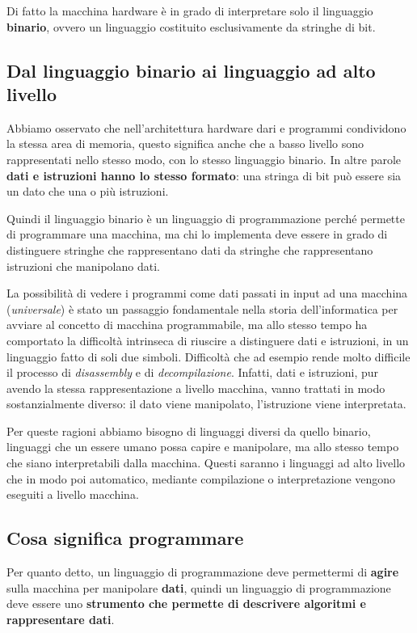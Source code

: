 \documentclass[oneside,a4paper,11pt]{book}
\theoremstyle{italicstyle}
\theoremstyle{normStyle}
\begin{document}
Di fatto la macchina hardware è in grado di interpretare solo il 
linguaggio \textbf{binario}, ovvero un linguaggio costituito esclusivamente 
da stringhe di bit.
\subsection{Dal linguaggio binario ai linguaggio ad alto livello}
Abbiamo osservato che nell'architettura hardware dari e programmi 
condividono la stessa area di memoria, questo significa anche che a basso 
livello sono rappresentati nello stesso modo, con lo stesso linguaggio 
binario. In altre parole \textbf{dati e istruzioni hanno lo stesso formato}: 
una stringa di bit può essere sia un dato che una o più istruzioni.

Quindi il linguaggio binario è un linguaggio di programmazione perché 
permette di programmare una macchina, ma chi lo implementa deve essere 
in grado di distinguere stringhe che rappresentano dati da stringhe 
che rappresentano istruzioni che manipolano dati.

La possibilità di vedere i programmi come dati passati in input ad 
una macchina (\textit{universale}) è stato un passaggio fondamentale 
nella storia dell'informatica per avviare al concetto di macchina 
programmabile, ma allo stesso tempo ha comportato la difficoltà intrinseca 
di riuscire a distinguere dati e istruzioni, in un linguaggio fatto di soli 
due simboli. Difficoltà che ad esempio rende molto difficile il processo 
di \textit{disassembly} e di \textit{decompilazione}. Infatti, dati 
e istruzioni, pur avendo la stessa rappresentazione a livello macchina, 
vanno trattati in modo sostanzialmente diverso: il dato viene manipolato, 
l'istruzione viene interpretata.

Per queste ragioni abbiamo bisogno di linguaggi diversi da quello binario, 
linguaggi che un essere umano possa capire e manipolare, ma allo stesso 
tempo che siano interpretabili dalla macchina. Questi saranno i 
linguaggi ad alto livello che in modo poi automatico, mediante compilazione 
o interpretazione vengono eseguiti a livello macchina.
\subsection{Cosa significa programmare}
Per quanto detto, un linguaggio di programmazione deve permettermi 
di \textbf{agire} sulla macchina per manipolare \textbf{dati}, quindi un linguaggio
di programmazione deve essere uno \textbf{strumento che permette di 
descrivere algoritmi e rappresentare dati}.
\end{document}
